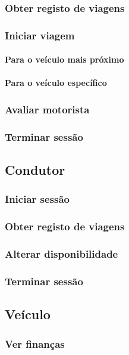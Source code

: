\documentclass[a4paper]{article}
\begin{document}
\subsubsection{Obter registo de viagens}
\subsubsection{Iniciar viagem}
\paragraph{Para o veículo mais próximo}
\paragraph{Para o veículo específico}
\subsubsection{Avaliar motorista}
\subsubsection{Terminar sessão}

\subsection{Condutor}
\subsubsection{Iniciar sessão}
\subsubsection{Obter registo de viagens}
\subsubsection{Alterar disponibilidade}
\subsubsection{Terminar sessão}

\subsection{Veículo}
\subsubsection{Ver finanças}
\end{document}
